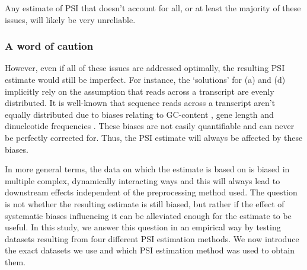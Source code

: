 Any estimate of PSI that doesn't account for all, or at least the majority of these issues, will likely be very unreliable. 

\subsubsection{A word of caution} \label{subsubsec:caution}
However, even if all of these issues are addressed optimally, the resulting PSI estimate would still be imperfect. For instance, the `solutions' for (a) and (d) implicitly rely on the assumption that reads across a transcript are evenly distributed. It is well-known that sequence reads across a transcript aren't equally distributed due to biases relating to GC-content \cite{gccontentbias}, gene length and dinucleotide frequencies \cite{rnaseqbiascorrection}.
These biases are not easily quantifiable and can never be perfectly corrected for. Thus, the PSI estimate will always be affected by these biases. 

In more general terms, the data on which the estimate is based on is biased in multiple complex, dynamically interacting ways and this will always lead to downstream effects independent of the preprocessing method used. The question is not whether the resulting estimate is still biased, but rather if the effect of systematic biases influencing it can be alleviated enough for the estimate to be useful. In this study, we answer this question in an empirical way by testing datasets resulting from four different PSI estimation methods. We now introduce the exact datasets we use and which PSI estimation method was used to obtain them. 
